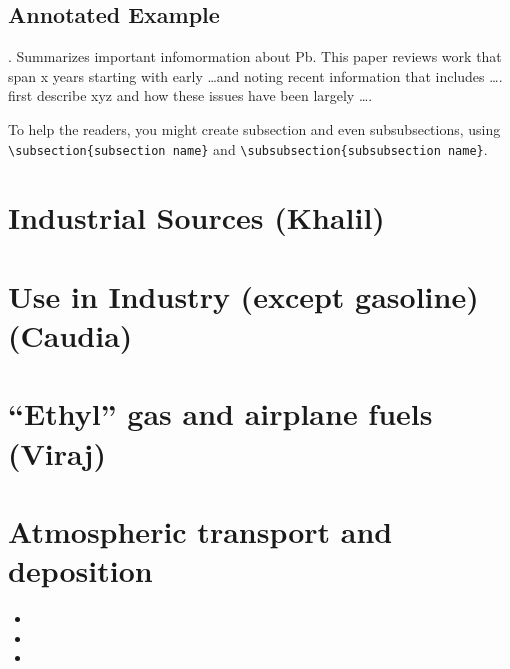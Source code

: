 \documentclass{article}\usepackage[]{graphicx}\usepackage[]{color}
\begin{document}
\subsection{Annotated Example}

\bigskip
\noindent {} . Summarizes important infomormation about Pb. This paper reviews work that span x years starting with early \ldots and noting recent information that includes \ldots. \cite{barltrop1975absorption} first describe xyz and how these issues have been largely \ldots.

\bigskip


To help the readers, you might create subsection and even subsubsections, using \verb!\subsection{subsection name}! and \verb!\subsubsection{subsubsection name}!. 


\section{Industrial Sources (Khalil)}


\section{Use in Industry (except gasoline) (Caudia)}

\section{``Ethyl'' gas and airplane fuels (Viraj)}

\section{Atmospheric transport and deposition}
\begin{itemize}
  \item {}
  \item {}
  \item {}
\end{itemize}
\end{document}
